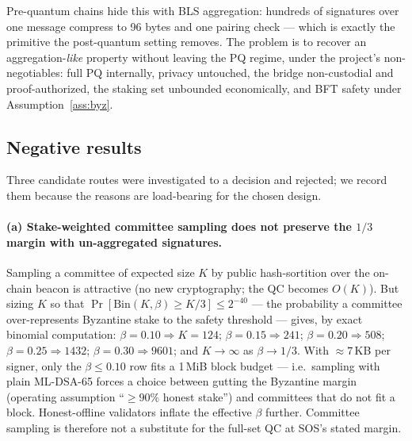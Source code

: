 \documentclass[11pt]{article}
\newcommand{\mldsa}{ML\mbox{-}DSA\mbox{-}65}
\theoremstyle{plain}
\theoremstyle{definition}
\theoremstyle{remark}
\begin{document}
Pre-quantum chains hide this with BLS aggregation: hundreds of signatures
over one message compress to 96 bytes and one pairing check --- which is
exactly the primitive the post-quantum setting removes. The problem is to
recover an aggregation-\emph{like} property without leaving the PQ regime,
under the project's non-negotiables: full PQ internally, privacy untouched,
the bridge non-custodial and proof-authorized, the staking set unbounded
economically, and BFT
safety under Assumption~\ref{ass:byz}.

\subsection{Negative results}
\label{sec:negative}

Three candidate routes were investigated to a decision and rejected; we
record them because the reasons are load-bearing for the chosen design.

\paragraph{(a) Stake-weighted committee sampling does not preserve the
$1/3$ margin with un-aggregated signatures.} Sampling a committee of
expected size $K$ by public hash-sortition over the on-chain beacon is
attractive (no new cryptography; the QC becomes $O(K)$). But sizing $K$ so
that $\Pr[\mathrm{Bin}(K, \beta) \ge K/3] \le 2^{-40}$ --- the probability a
committee over-represents Byzantine stake to the safety threshold --- gives,
by exact binomial computation: $\beta = 0.10 \Rightarrow K = 124$;
$\beta = 0.15 \Rightarrow 241$; $\beta = 0.20 \Rightarrow 508$;
$\beta = 0.25 \Rightarrow 1432$; $\beta = 0.30 \Rightarrow 9601$; and
$K \to \infty$ as $\beta \to 1/3$. With $\approx 7$\,KB per signer, only the
$\beta \le 0.10$ row fits a 1\,MiB block budget --- i.e.\ sampling with
plain \mldsa{} forces a choice between gutting the Byzantine margin
(operating assumption ``$\ge 90\%$ honest stake'') and committees that do
not fit a block. Honest-offline validators inflate the effective $\beta$
further. Committee sampling is therefore not a substitute for the full-set
QC at SOS's stated margin.
\end{document}
